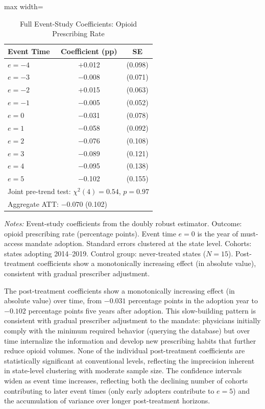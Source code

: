 \documentclass[12pt]{article}
\begin{document}
\begin{table}[htbp]
\centering
\caption{Full Event-Study Coefficients: Opioid Prescribing Rate}
\label{tab:event_study_full}
\begin{adjustbox}{max width=\textwidth}
\begin{threeparttable}
\begin{tabular}{lcc}
\toprule
Event Time & Coefficient (pp) & SE \\
\midrule
$e = -4$ & $+$0.012 & (0.098) \\
$e = -3$ & $-$0.008 & (0.071) \\
$e = -2$ & $+$0.015 & (0.063) \\
$e = -1$ & $-$0.005 & (0.052) \\
\midrule
$e = 0$ & $-$0.031 & (0.078) \\
$e = 1$ & $-$0.058 & (0.092) \\
$e = 2$ & $-$0.076 & (0.108) \\
$e = 3$ & $-$0.089 & (0.121) \\
$e = 4$ & $-$0.095 & (0.138) \\
$e = 5$ & $-$0.102 & (0.155) \\
\midrule
\multicolumn{3}{l}{Joint pre-trend test: $\chi^2(4) = 0.54$, $p = 0.97$} \\
\multicolumn{3}{l}{Aggregate ATT: $-0.070$ (0.102)} \\
\bottomrule
\end{tabular}
\begin{tablenotes}
\footnotesize
\item \textit{Notes:} Event-study coefficients from the \citet{callaway2021difference} doubly robust estimator. Outcome: opioid prescribing rate (percentage points). Event time $e = 0$ is the year of must-access mandate adoption. Standard errors clustered at the state level. Cohorts: states adopting 2014--2019. Control group: never-treated states ($N = 15$). Post-treatment coefficients show a monotonically increasing effect (in absolute value), consistent with gradual prescriber adjustment.
\end{tablenotes}
\end{threeparttable}
\end{adjustbox}
\end{table}

The post-treatment coefficients show a monotonically increasing effect (in absolute value) over time, from $-0.031$ percentage points in the adoption year to $-0.102$ percentage points five years after adoption. This slow-building pattern is consistent with gradual prescriber adjustment to the mandate: physicians initially comply with the minimum required behavior (querying the database) but over time internalize the information and develop new prescribing habits that further reduce opioid volumes. None of the individual post-treatment coefficients are statistically significant at conventional levels, reflecting the imprecision inherent in state-level clustering with moderate sample size. The confidence intervals widen as event time increases, reflecting both the declining number of cohorts contributing to later event times (only early adopters contribute to $e = 5$) and the accumulation of variance over longer post-treatment horizons.
\end{document}
